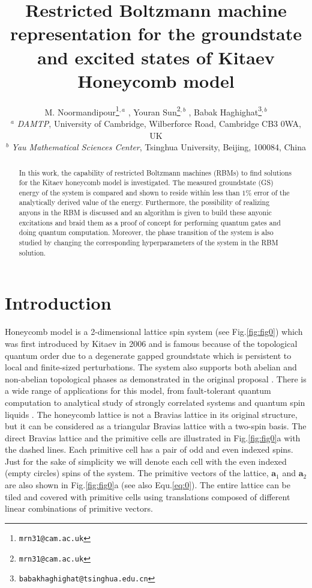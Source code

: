 \documentclass{article}
\title{Restricted Boltzmann machine representation for the groundstate and excited states of Kitaev Honeycomb model}
\author{
    M. Noormandipour\thanks{\texttt{mrn31@cam.ac.uk}}\hspace{1mm}$^{,a}$ , Youran Sun\thanks{\texttt{mrn31@cam.ac.uk}}\hspace{1mm}$^{,b}$ , Babak Haghighat\thanks{\texttt{babakhaghighat@tsinghua.edu.cn}}\hspace{1mm}$^{,b}$ \\
	$^{a}$ \textit{DAMTP}, University of Cambridge, Wilberforce Road, Cambridge CB3 0WA, UK \\
	$^{b}$ \textit{Yau Mathematical Sciences Center}, Tsinghua University, Beijing, 100084, China\\
}
\begin{document}
\maketitle

\begin{abstract}
In this work, the capability of restricted Boltzmann machines (RBMs) to find solutions for the Kitaev honeycomb model is investigated. The measured groundstate (GS) energy of the system is compared and shown to reside within less than $1\%$ error of the analytically derived value of the energy. Furthermore, the possibility of realizing anyons in the RBM is discussed and an algorithm is given to build these anyonic excitations and braid them as a proof of concept for performing quantum gates and doing quantum computation. Moreover, the phase transition of the system is also studied by changing the corresponding hyperparameters of the system in the RBM solution.
\end{abstract}




\section{Introduction}
Honeycomb model is a 2-dimensional lattice spin system (see Fig.\hspace{0.2mm}\ref{fig:fig0}) which was first introduced by Kitaev in 2006 \cite{kita} and is famous because of the topological quantum order due to a degenerate gapped groundstate which is persistent to local and finite-sized perturbations. The system also supports both abelian and non-abelian topological phases as demonstrated in the original proposal \cite{kita}. There is a wide range of applications for this model, from fault-tolerant quantum computation \cite{kita2} to analytical study of strongly correlated systems \cite{str-cor} and quantum spin liquids \cite{spi-liq}. The honeycomb lattice is not a Bravias lattice in its original structure, but it can be considered as a triangular Bravias lattice with a two-spin basis. The direct Bravias lattice and the primitive cells are illustrated in Fig.\hspace{0.2mm}\ref{fig:fig0}a with the dashed lines. Each primitive cell has a pair of odd and even indexed spins. Just for the sake of simplicity we will denote each cell with the even indexed (empty circles) spins of the system. The primitive vectors of the lattice, $\textbf{a}_1$ and $\textbf{a}_2$ are also shown in Fig.\hspace{0.2mm}\ref{fig:fig0}a (see also Equ.\hspace{0.2mm}\ref{eq:0}). The entire lattice can be tiled and covered with primitive cells using translations composed of different linear combinations of primitive vectors. 
\end{document}
